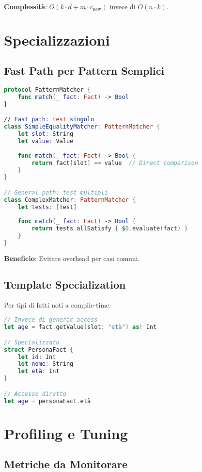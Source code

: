 \textbf{Complessità}: $O(k \cdot d + m \cdot c_{\text{new}})$ invece di $O(n \cdot k)$.

\section{Specializzazioni}

\subsection{Fast Path per Pattern Semplici}

\begin{lstlisting}[language=Swift]
protocol PatternMatcher {
    func match(_ fact: Fact) -> Bool
}

// Fast path: test singolo
class SimpleEqualityMatcher: PatternMatcher {
    let slot: String
    let value: Value
    
    func match(_ fact: Fact) -> Bool {
        return fact[slot] == value  // Direct comparison
    }
}

// General path: test multipli
class ComplexMatcher: PatternMatcher {
    let tests: [Test]
    
    func match(_ fact: Fact) -> Bool {
        return tests.allSatisfy { $0.evaluate(fact) }
    }
}
\end{lstlisting}

\textbf{Beneficio}: Evitare overhead per casi comuni.

\subsection{Template Specialization}

Per tipi di fatti noti a compile-time:

\begin{lstlisting}[language=Swift]
// Invece di generic access
let age = fact.getValue(slot: "età") as! Int

// Specializzato
struct PersonaFact {
    let id: Int
    let nome: String
    let età: Int
}

// Accesso diretto
let age = personaFact.età
\end{lstlisting}

\section{Profiling e Tuning}

\subsection{Metriche da Monitorare}

